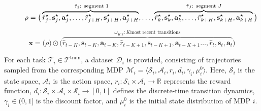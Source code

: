 \documentclass{article} %
\begin{document}
\begin{figure*}[]
   \centering
    \begin{equation}
        \rho = \big(
        \overbrace{
        \hat{r}_j^\star, \mathbf{s}_j^\star, \mathbf{a}_j^\star, 
        \dots,
        \hat{r}_{j+H}^\star, \mathbf{s}_{j+H}^\star, \mathbf{a}_{j+H}^\star}
        ^{\text{ $\Tilde{\tau}_1$: segment 1}},
        \dots,
        \overbrace{
        \hat{r}_k^\star, \mathbf{s}_k^\star, \mathbf{a}_k^\star, 
        \dots,
        \hat{r}_{k+H}^\star, \mathbf{s}_{k+H}^\star, \mathbf{a}_{k+H}^\star}
        ^{\text{$\Tilde{\tau}_J$: segment } J}
        \big)
    \label{eq:pdt}
    \end{equation}
\end{figure*}
\begin{figure*}
   \centering
    \begin{equation}
    \mathbf{x} = 
        \big( \rho \big) \odot
        \big(
        \overbrace{
        \hat{r}_{t-K}, \mathbf{s}_{t-K}, \mathbf{a}_{t-K}, 
        \hat{r}_{t-K+1}, \mathbf{s}_{t-K+1}, \mathbf{a}_{t-K+1}
        \dots,
        \hat{r}_{t}, \mathbf{s}_{t}, \mathbf{a}_{t}
        }^{\omega_{K:t}: K \text{most recent transitions}}
        \big)
    \label{eq:pdt-seq}
    \end{equation}
\end{figure*}

For each task $\mathcal{T}_i \in \mathcal{T}^\text{train}$, a dataset $\mathcal{D}_i$ is provided, consisting of trajectories sampled from the corresponding MDP $\mathcal{M}_i = \langle \mathcal{S}_i, \mathcal{A}_i, r_i, d_i, \gamma_i, \mu_i^0 \rangle$. Here, $\mathcal{S}_i$ is the state space, $\mathcal{A}_i$ is the action space, $r_i: \mathcal{S}_i \times \mathcal{A}_i \to \mathbb{R}$ represents the reward function, $d_i: \mathcal{S}_i \times \mathcal{A}_i \times \mathcal{S}_i \to [0, 1]$ defines the discrete-time transition dynamics, $\gamma_i \in (0, 1]$ is the discount factor, and $\mu_i^0$ is the initial state distribution of MDP $i$. 
\end{document}
